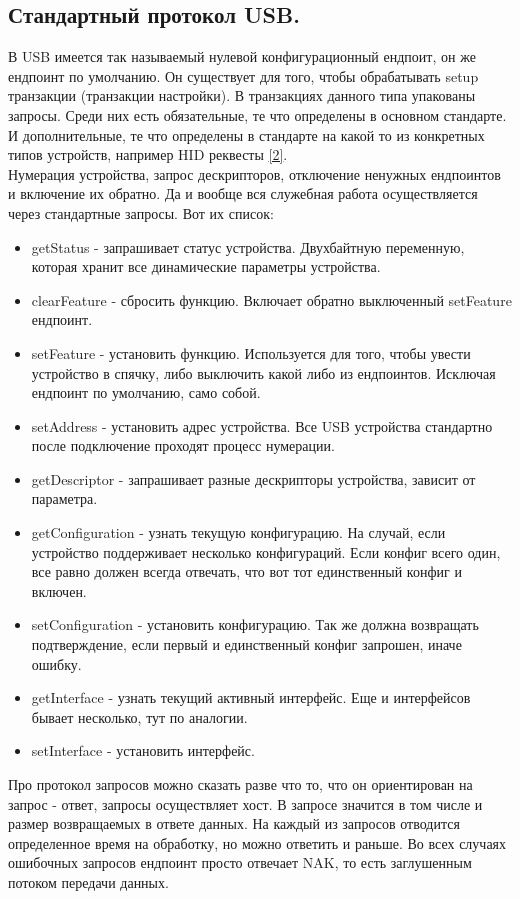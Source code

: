 \documentclass[12pt,a4paper]{article}
\begin{document}
\subsection{Стандартный протокол USB.}
    В USB имеется так называемый нулевой конфигурационный ендпоит, он же
    ендпоинт по умолчанию. Он существует для того, чтобы обрабатывать setup
    транзакции (транзакции настройки). В транзакциях данного типа упакованы
    запросы. Среди них есть обязательные, те что определены в основном
    стандарте. И дополнительные, те что определены в стандарте на какой
    то из конкретных типов устройств, например HID реквесты \ref{2}.\\
    Нумерация устройства, запрос дескрипторов, отключение ненужных ендпоинтов
    и включение их обратно. Да и вообще вся служебная работа осуществляется
    через стандартные запросы. Вот их список:
\begin{itemize}
    \item getStatus - запрашивает статус устройства. Двухбайтную переменную,
    которая хранит все динамические параметры устройства.
    \item clearFeature - сбросить функцию. Включает обратно выключенный
    setFeature ендпоинт.
    \item setFeature - установить функцию. Используется для того, чтобы
    увести устройство в спячку, либо выключить какой либо из ендпоинтов.
    Исключая ендпоинт по умолчанию, само собой.
    \item setAddress - установить адрес устройства. Все USB устройства
    стандартно после подключение проходят процесс нумерации.
    \item getDescriptor - запрашивает разные дескрипторы устройства, зависит от
    параметра.
    \item getConfiguration - узнать текущую конфигурацию. На случай, если
    устройство поддерживает несколько
    конфигураций. Если конфиг всего один, все равно должен всегда отвечать, что
    вот тот единственный конфиг и включен.
    \item setConfiguration - установить конфигурацию. Так же должна возвращать
    подтверждение, если первый и единственный конфиг запрошен, иначе ошибку.
    \item getInterface - узнать текущий активный интерфейс. Еще и интерфейсов
    бывает несколько, тут по аналогии.
    \item setInterface - установить интерфейс.
\end{itemize}
    Про протокол запросов можно сказать разве что то, что он ориентирован на
    запрос - ответ, запросы осуществляет хост. В запросе значится в том числе
    и размер возвращаемых в ответе данных. На каждый из запросов отводится
    определенное время на обработку, но можно ответить и раньше. Во всех случаях
    ошибочных запросов
    ендпоинт просто отвечает NAK, то есть заглушенным потоком передачи данных.
\end{document}
